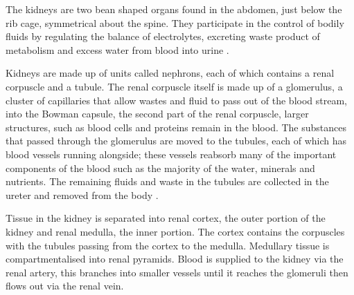 The kidneys are two bean shaped organs found in the abdomen, just below the rib cage, symmetrical about the spine. They participate in the control of bodily fluids by regulating the balance of electrolytes, excreting waste product of metabolism and excess water from blood into urine \cite{lote_principles_2012}. 

Kidneys are made up of units called nephrons, each of which contains a renal corpuscle and a tubule. The renal corpuscle itself is made up of a glomerulus, a cluster of capillaries that allow wastes and fluid to pass out of the blood stream, into the Bowman capsule, the second part of the renal corpuscle, larger structures, such as blood cells and proteins remain in the blood. The substances that passed through the glomerulus are moved to the tubules, each of which has blood vessels running alongside; these vessels reabsorb many of the important components of the blood such as the majority of the water, minerals and nutrients. The remaining fluids and waste in the tubules are collected in the ureter and removed from the body \cite{hall_guyton_2015}.

Tissue in the kidney is separated into renal cortex, the outer portion of the kidney and renal medulla, the inner portion. The cortex contains the corpuscles with the tubules passing from the cortex to the medulla. Medullary tissue is compartmentalised into renal pyramids. Blood is supplied to the kidney via the renal artery, this branches into smaller vessels until it reaches the glomeruli then flows out via the renal vein.

